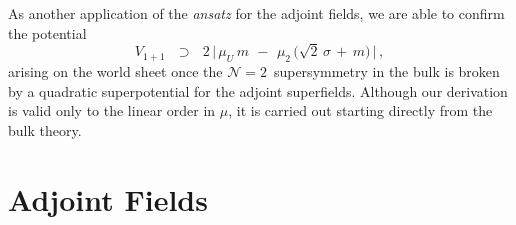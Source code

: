 \documentclass[12pt]{article}
\def\beq{\begin{equation}}
\def\eeq{\end{equation}}
\newcommand{\ntwon}{${\mathcal N}=2$}
\newcommand{\ansatz}{{\it ansatz} }
\begin{document}
	As another application of the \ansatz for the adjoint fields, we are able to confirm the potential 
\beq
\label{Vmu}
	V_{1+1}    \:~~\supset~~\:
	2\, \Big|\, \mu_U\, m  \,~-~\,  \mu_2\, \big( \sqrt{2}\,\sigma \,+\, m \big) \,\Big|\,,
\eeq
	arising on the world sheet \cite{Shifman:2010kr} 
	once the \ntwon\, supersymmetry in the bulk is broken by a quadratic superpotential for the
	adjoint superfields.
	Although our derivation is valid only to the linear order in $ \mu $, it is carried out
	starting directly from the bulk theory.




\section{Adjoint Fields}
\end{document}

